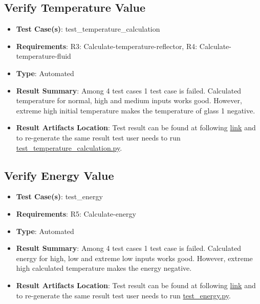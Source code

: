 \documentclass[12pt, titlepage]{article}
\begin{document}
\subsection{Verify Temperature Value} 
\begin{itemize}
    \item \textbf{Test Case(s)}: test\_temperature\_calculation
    \item \textbf{Requirements}: R3: Calculate-temperature-reflector, R4: Calculate-temperature-fluid    
    \item \textbf{Type}: Automated 
    \item \textbf{Result Summary}: Among 4 test cases 1 test case is failed. Calculated temperature for normal, high and medium inputs works good. However, extreme high initial temperature makes the temperature of glass 1 negative.    
    \item \textbf{Result Artifacts Location}: Test result can be found at following \href{https://github.com/DeeshaPatel/CAS-741-Solar-Cooker/blob/d897d6792e6d9ba9902f98b455a49e7d44018f44/test/Functional%20Requirement/test_temperature_calculation.log}{link} and to re-generate the same result test user needs to run \href{https://github.com/DeeshaPatel/CAS-741-Solar-Cooker/blob/3e5bf1194efffc31e44fa89c7431ddf429c37407/src/testing/test_temperature_calculation.py}{test\_temperature\_calculation.py}.  
\end{itemize}


\subsection{Verify Energy Value} 
\begin{itemize}
    \item \textbf{Test Case(s)}: test\_energy
    \item \textbf{Requirements}: R5: Calculate-energy   
    \item \textbf{Type}: Automated 
    \item \textbf{Result Summary}: Among 4 test cases 1 test case is failed. Calculated energy for high, low and extreme low inputs works good. However, extreme high calculated temperature makes the energy negative.    
    \item \textbf{Result Artifacts Location}: Test result can be found at following \href{https://github.com/DeeshaPatel/CAS-741-Solar-Cooker/blob/7f47eded73f71ad306630336dbd086cbd7475b7e/test/Functional%20Requirement/test_energy.log}{link} and to re-generate the same result test user needs to run \href{https://github.com/DeeshaPatel/CAS-741-Solar-Cooker/blob/3e5bf1194efffc31e44fa89c7431ddf429c37407/src/testing/test_energy.py}{test\_energy.py}.  
\end{itemize}
\end{document}
